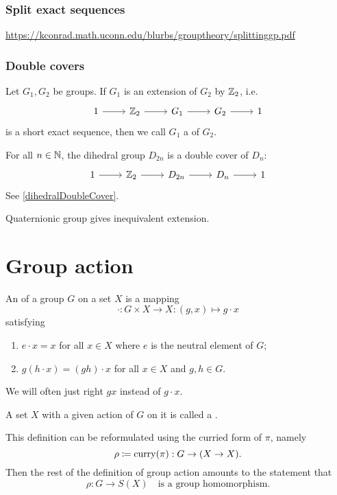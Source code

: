 \subsubsection{Split exact sequences}
\url{https://kconrad.math.uconn.edu/blurbs/grouptheory/splittinggp.pdf}

\subsubsection{Double covers}
\begin{definition}
Let $G_1, G_2$ be groups. If $G_1$ is an extension of $G_2$ by $\mathbb{Z}_2$, i.e.\
\[\begin{tikzcd}
1 \rar & \Z_2 \rar & G_1 \rar & G_2 \rar & 1
\end{tikzcd} \]
is a short exact sequence, then we call $G_1$ a  of $G_2$.
\end{definition}

\begin{example}
For all $n\in \mathbb{N}$, the dihedral group $D_{2n}$ is a double cover of $D_n$:
\[\begin{tikzcd}
1 \rar & \Z_2 \rar & D_{2n} \rar & D_n \rar & 1
\end{tikzcd} \]
See \ref{dihedralDoubleCover}.
\end{example}
Quaternionic group gives inequivalent extension.


\section{Group action}
\begin{definition}
An  of a group $G$ on a set $X$ is a mapping
\[ \cdot: G\times X \to X: (g,x) \mapsto g\cdot x \]
satisfying
\begin{enumerate}
\item $e\cdot x = x$ for all $x\in X$ where $e$ is the neutral element of $G$;
\item $g(h\cdot x) = (gh)\cdot x$ for all $x\in X$ and $g,h\in G$.
\end{enumerate}
We will often just right $gx$ instead of $g\cdot x$.

A set $X$ with a given action of $G$ on it is called a .
\end{definition}
This definition can be reformulated using the curried form of $\pi$, namely
\[ \rho \coloneqq \operatorname{curry}(\pi): G \to (X\to X). \]
Then the rest of the definition of group action amounts to the statement that 
\[ \rho: G \to S(X) \quad \text{is a group homomorphism.} \]

